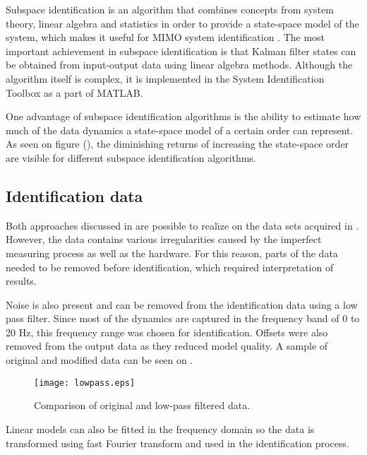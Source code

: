 Subspace identification is an algorithm that combines concepts from system theory, linear algebra and statistics in order to provide a state-space model of the system, which makes it useful for MIMO system identification \cite{van2012subspace}. 
The most important achievement in subspace identification is that Kalman filter states can be obtained from input-output data using linear algebra methods.
Although the algorithm itself is complex, it is implemented in the System Identification Toolbox as a part of MATLAB.

One advantage of subspace identification algorithms is the ability to estimate how much of the data dynamics a state-space model of a certain order can represent. 
As seen on figure (), the diminishing returns of increasing the state-space order are visible for different subspace identification algorithms.


\subsection{Identification data}

Both approaches discussed in  are possible to realize on the data sets acquired in .
However, the data contains various irregularities caused by the imperfect measuring process as well as the hardware. 
For this reason, parts of the data needed to be removed before identification, which required interpretation of results.

Noise is also present and can be removed from the identification data using a low pass filter.
Since most of the dynamics are captured in the frequency band of 0 to 20 Hz, this frequency range was chosen for identification.
Offsets were also removed from the output data as they reduced model quality.
A sample of original and modified data can be seen on .

\begin{figure}[H]
\centering
\texttt{[image: lowpass.eps]}
\caption{Comparison of original and low-pass filtered data.}
\label{figlowpass}
\end{figure}

Linear models can also be fitted in the frequency domain so the data is transformed using fast Fourier transform \cite{van1992computational} and used in the identification process.

